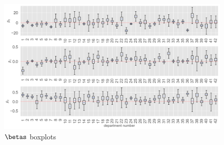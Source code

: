 \documentclass[paper=a4, fontsize=11pt]{scrartcl}
\begin{document}
\begin{figure}[!htb]\label{corr_mat}
\centering
\includegraphics[width=1\textwidth]{project/writeup/box_plots.png}
\caption{$\betas$ boxplots}
\end{figure}


 

\end{document}

